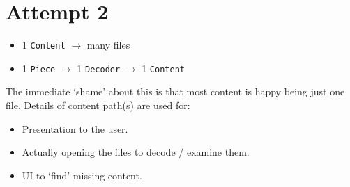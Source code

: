 \documentclass{article}
\begin{document}
\section{Attempt 2}

\begin{itemize}
\item 1 \texttt{Content} $\to$ many files
\item 1 \texttt{Piece} $\to$ 1 \texttt{Decoder} $\to$ 1 \texttt{Content}
\end{itemize}

The immediate `shame' about this is that most content is happy being
just one file.  Details of content path(s) are used for:

\begin{itemize}
\item Presentation to the user.
\item Actually opening the files to decode / examine them.
\item UI to `find' missing content.
\end{itemize}
\end{document}
